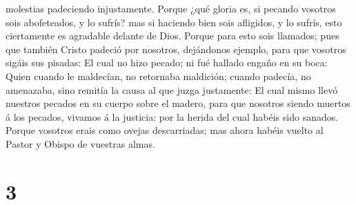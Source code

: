 molestias padeciendo injustamente.  Porque ¿qué gloria
es, si pecando vosotros sois abofeteados, y lo sufrís? mas si haciendo
bien sois afligidos, y lo sufrís, esto ciertamente es agradable delante
de Dios.  Porque para esto sois llamados; pues que
también Cristo padeció por nosotros, dejándonos ejemplo, para que
vosotros sigáis sus pisadas:  El cual no hizo pecado; ni
fué hallado engaño en su boca:  Quien cuando le
maldecían, no retornaba maldición; cuando padecía, no amenazaba, sino
remitía la causa al que juzga justamente:  El cual mismo
llevó nuestros pecados en su cuerpo sobre el madero, para que nosotros
siendo muertos á los pecados, vivamos á la justicia: por la herida del
cual habéis sido sanados.  Porque vosotros erais como
ovejas descarriadas; mas ahora habéis vuelto al Pastor y Obispo de
vuestras almas.

\hypertarget{section-2}{%
\section{3}\label{section-2}}

